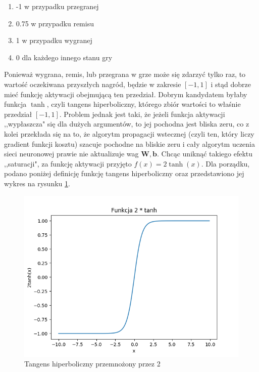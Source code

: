 \documentclass[licencjacka]{pracamgr}
\begin{document}
\begin{enumerate}
	\item{-1 w przypadku przegranej}
	\item{0.75 w przypadku remisu }
	\item{1 w przypadku wygranej}
	\item{0 dla każdego innego stanu gry}
\end{enumerate}

Ponieważ wygrana, remis, lub przegrana w grze może się zdarzyć tylko raz, to wartość oczekiwana przyszłych nagród, będzie w zakresie  $[-1,1]$ i  stąd dobrze mieć funkcję aktywacji obejmującą ten przedział. Dobrym kandydatem byłaby funkcja $\tanh$, czyli tangens hiperboliczny, którego zbiór wartości to właśnie przedział $[-1,1]$. Problem jednak jest taki, że jeżeli funkcja aktywacji ,,wypłaszcza" się dla dużych argumentów, to jej pochodna jest bliska zeru, co z kolei przekłada się na to, że algorytm propagacji wstecznej (czyli ten, który liczy gradient funkcji kosztu) szacuje pochodne na bliskie zeru i cały algorytm uczenia sieci neuronowej prawie nie aktualizuje wag $\mathbf{W}, \mathbf{b}$. Chcąc uniknąć takiego efektu ,,saturacji", za funkcję aktywacji przyjęto $f(x) = 2\tanh(x)$. Dla porządku, podano poniżej definicję funkcję tangens hiperboliczny oraz przedstawiono jej wykres na rysunku \ref{Rys24}.

\begin{figure}[h!]
	\includegraphics [scale=0.5]{tanh.png}
	\caption{Tangens hiperboliczny przemnożony przez 2}
	\label{Rys24}
\end{figure}
\end{document}
